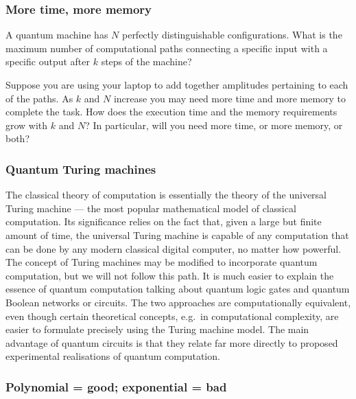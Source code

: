 \documentclass[fleqn]{article}
\begin{document}
\hypertarget{more-time-more-memory}{%
\subsubsection{More time, more memory}\label{more-time-more-memory}}

A quantum machine has \(N\) perfectly distinguishable configurations.
What is the maximum number of computational paths connecting a specific input with a specific output after \(k\) steps of the machine?

Suppose you are using your laptop to add together amplitudes pertaining to each of the paths.
As \(k\) and \(N\) increase you may need more time and more memory to complete the task.
How does the execution time and the memory requirements grow with \(k\) and \(N\)?
In particular, will you need more time, or more memory, or both?

\hypertarget{quantum-turing-machines}{%
\subsubsection{Quantum Turing machines}\label{quantum-turing-machines}}

The classical theory of computation is essentially the theory of the universal Turing machine --- the most popular mathematical model of classical computation.
Its significance relies on the fact that, given a large but finite amount of time, the universal Turing machine is capable of any computation that can be done by any modern classical digital computer, no matter how powerful.
The concept of Turing machines may be modified to incorporate quantum computation, but we will not follow this path.
It is much easier to explain the essence of quantum computation talking about quantum logic gates and quantum Boolean networks or circuits.
The two approaches are computationally equivalent, even though certain theoretical concepts, e.g.~in computational complexity, are easier to formulate precisely using the Turing machine model.
The main advantage of quantum circuits is that they relate far more directly to proposed experimental realisations of quantum computation.

\hypertarget{polynomial-good-exponential-bad}{%
\subsubsection{Polynomial = good; exponential = bad}\label{polynomial-good-exponential-bad}}
\end{document}
